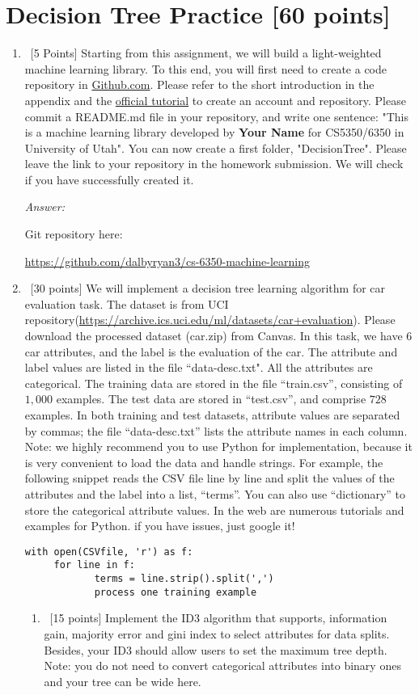 \documentclass[12pt, fullpage,letterpaper]{article}
\begin{document}
\section{Decision Tree Practice [60 points]}
\begin{enumerate}
	\item~[5 Points] Starting from this assignment, we will build a light-weighted machine learning library. 
To this end, you will first need to create a code repository in \href{https://github.com/}{Github.com}. Please refer to the short introduction in the appendix and the \href{https://guides.github.com/activities/hello-world/}{official tutorial} to create an account and repository. Please commit a README.md file in your repository, and write one sentence: "This is a machine learning library developed by \textbf{Your Name} for CS5350/6350 in University of Utah".  You can now create a first folder, "DecisionTree". Please leave the link to your repository in the homework submission. We will check if you have successfully created it. 

\textit{Answer:} 

Git repository here: 

\url{https://github.com/dalbyryan3/cs-6350-machine-learning}


\item~[30 points] We will implement a decision tree learning algorithm for car evaluation task. The dataset is from UCI repository(\url{https://archive.ics.uci.edu/ml/datasets/car+evaluation}). Please download the processed dataset (car.zip) from Canvas.  In this task, we have $6$ car attributes, and the label is the evaluation of the car. The attribute and label values are listed in the file ``data-desc.txt". All the attributes are categorical.  The training data are stored in the file ``train.csv'', consisting of $1,000$ examples. The test data are stored in ``test.csv'', and comprise $728$ examples. In both training and test datasets, attribute values are separated by commas; the file ``data-desc.txt''  lists the attribute names in each column. 
\\

\noindent Note: we highly recommend you to use Python for implementation, because it is very convenient to load the data and handle strings. For example, the following snippet reads the CSV file line by line and split the values of the attributes and the label into a list, ``terms''. You can also use ``dictionary'' to store the categorical attribute values. In the web are numerous tutorials and examples for Python. if you have issues, just google it!
\begin{lstlisting}
with open(CSVfile, 'r') as f:
     for line in f:
            terms = line.strip().split(',')
            process one training example
\end{lstlisting}
\begin{enumerate}
\item~[15 points] Implement the ID3 algorithm that supports, information gain,  majority error and gini index to select attributes for data splits. Besides, your ID3 should allow users to set the maximum tree depth. Note: you do not need to convert categorical attributes into binary ones and your tree can be wide here. 


\end{enumerate}
\end{enumerate}
\end{document}
